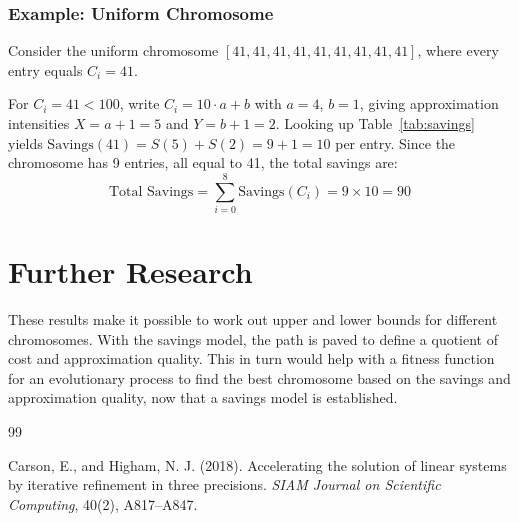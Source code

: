 \documentclass[a4paper,11pt]{article}
\begin{document}
\subsubsection*{Example: Uniform Chromosome}

Consider the uniform chromosome $[41, 41, 41, 41, 41, 41, 41, 41, 41]$, where every entry equals $C_i = 41$.

For $C_i = 41 < 100$, write $C_i = 10 \cdot a + b$ with $a = 4$, $b = 1$, giving approximation intensities $X = a + 1 = 5$ and $Y = b + 1 = 2$. Looking up Table~\ref{tab:savings} yields $\text{Savings}(41) = S(5) + S(2) = 9 + 1 = 10$ per entry. Since the chromosome has 9 entries, all equal to 41, the total savings are:
\begin{equation}
  \text{Total Savings} = \sum_{i=0}^{8} \text{Savings}(C_i) = 9 \times 10 = 90
\end{equation}

\section{Further Research}
These results make it possible to work out upper and lower bounds for different chromosomes.
With the savings model, the path is paved to define a quotient of cost and approximation quality.
This in turn would help with a fitness function for an evolutionary process to find the best chromosome based on
the savings and approximation quality, now that a savings model is established.

\begin{thebibliography}{99}

  Carson, E., and Higham, N. J. (2018).
  Accelerating the solution of linear systems by iterative refinement in three precisions.
  \textit{SIAM Journal on Scientific Computing}, 40(2), A817–A847.
\end{thebibliography}
\end{document}
